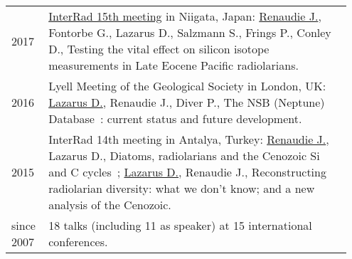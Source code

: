 \documentclass[11pt, a4paper]{article}
\begin{document}
\begin{longtable}{p{0.1\linewidth} P{0.85\linewidth}}
2017 & \href{http://interrad2017.random-walk.org/wp-content/uploads/2017/10/Abstracts_InterRadXV_171016b.pdf}{InterRad 15th meeting} in Niigata, Japan: \underline{Renaudie J.}, Fontorbe G., Lazarus D., Salzmann S., Frings P., Conley D., Testing the vital effect on silicon isotope measurements in Late Eocene Pacific radiolarians.\\
2016 & Lyell Meeting of the Geological Society in London, UK: \underline{Lazarus D.}, Renaudie J., Diver P., The NSB (Neptune) Database : current status and future development.\\
2015 & InterRad 14th meeting in Antalya, Turkey: \underline{Renaudie J.}, Lazarus D., Diatoms, radiolarians and the Cenozoic Si and C cycles ; \underline{Lazarus D.}, Renaudie J., Reconstructing radiolarian diversity: what we don't know; and a new analysis of the Cenozoic.\\
since 2007 & 18 talks (including 11 as speaker) at 15 international conferences.
\end{longtable}
\end{document}
